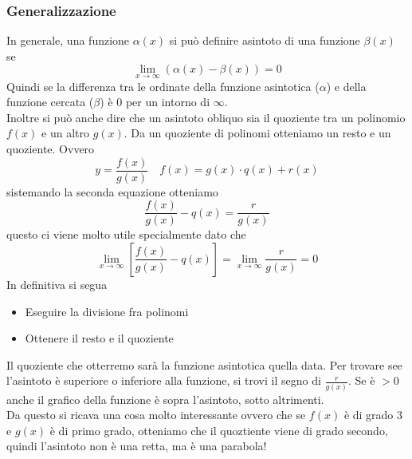 \subsubsection{Generalizzazione}
In generale, una funzione $\alpha(x)$ si può definire asintoto di una funzione $\beta(x)$ se
\begin{equation*}
  \lim_{x\to\infty}\left( \alpha(x) - \beta(x) \right) = 0
\end{equation*}
Quindi se la differenza tra le ordinate della funzione asintotica ($\alpha$) e della funzione 
cercata ($\beta$) è $0$ per un intorno di $\infty$.\\ [\baselineskip]
Inoltre si può anche dire che un asintoto obliquo sia il quoziente tra un polinomio $f(x)$ e un 
altro $g(x)$. Da un quoziente di polinomi otteniamo un resto e un quoziente. Ovvero
\begin{equation*}
  y = \frac{f(x)}{g(x)}\quad f(x) = g(x)\cdot q(x)+r(x)
\end{equation*}
sistemando la seconda equazione otteniamo
\begin{equation*}
  \frac{f(x)}{g(x)}-q(x) = \frac{r}{g(x)}
\end{equation*}
questo ci viene molto utile specialmente dato che
\begin{equation*}
  \lim_{x\to\infty} \left[ \frac{f(x)}{g(x)}-q(x) \right] = \lim_{x\to\infty} \frac{r}{g(x)} = 0
\end{equation*}
In definitiva si segua
\begin{itemize}
  \item Eseguire la divisione fra polinomi
  \item Ottenere il resto e il quoziente
\end{itemize}
Il quoziente che otterremo sarà la funzione asintotica quella data. Per trovare see l'asintoto
è superiore o inferiore alla funzione, si trovi il segno di $\frac{r}{g(x)}$. Se è $>0$ anche il
grafico della funzione è sopra l'asintoto, sotto altrimenti. \\ [\baselineskip]
Da questo si ricava una cosa molto interessante ovvero che se $f(x)$ è di grado 3 e $g(x)$ è 
di primo grado, otteniamo che il quoztiente viene di grado secondo, quindi l'asintoto non è
una retta, ma è una parabola!
